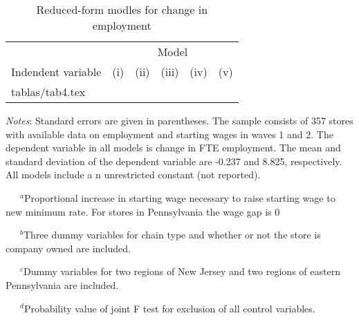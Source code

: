 \documentclass{article}
\makeatletter
\newcommand\primitiveinput[1]
{\@@input #1 }
\makeatother
\begin{document}
\begin{table}[H]
	\centering
	\label{tab:Table}
		\begin{threeparttable}
			\caption{Reduced-form modles for change in employment}
			\begin{tabular}{@{}l*{5}{c}@{}}
				\toprule
				& \multicolumn{5}{c}{Model}								\\ \cmidrule(l){2-6}
				Indendent variable & (i) & (ii) & (iii) & (iv) & (v) 	\\ \midrule
				\primitiveinput{tablas/tab4.tex}
				\bottomrule
			\end{tabular}
			\begin{tablenotes}
				\setlength{}
				\footnotesize
				\item \textit{Notes}: Standard errors are given in parentheses.
				The sample consists of 357 stores with available data on employment and starting wages in waves 1 and 2.
				The dependent variable in all models is change in FTE employment. The mean and standard deviation of
				the dependent variable are -0.237 and 8.825, respectively. All models include a n unrestricted constant (not reported).
				\item ~~~$^{a}$Proportional increase in starting wage necessary to raise starting wage to new minimum rate. For stores in Pennsylvania the wage gap is 0
				\item ~~~$^{b}$Three dummy variables for chain type and whether or not the store is company owned are included.
				\item ~~~$^{c}$Dummy variables for two regions of New Jersey and two regions of eastern Pennsylvania are included.
				\item ~~~$^{d}$Probability value of joint F test for exclusion of all control variables.
			\end{tablenotes}
		\end{threeparttable}
\end{table}
\end{document}
